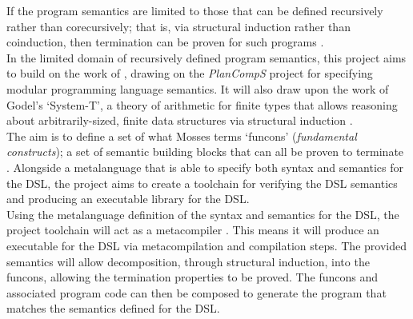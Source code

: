If the program semantics are limited to those that can be defined recursively rather than corecursively; that is, via structural induction rather than coinduction, then termination can be proven for such programs \citep{nordstrom1988terminating}.\\

In the limited domain of recursively defined program semantics, this project aims to build on the work of \cite{doh2001composing}, drawing on the \textit{PlanCompS} project for specifying modular programming language semantics.
It will also draw upon the work of Godel's `System-T', a theory of arithmetic for finite types that allows reasoning about arbitrarily-sized, finite data structures via structural induction \cite{girard1989proofs,alves2010godel}.\\

The aim is to define a set of what Mosses terms `funcons' (\textit{fundamental constructs}); a set of semantic building blocks that can all be proven to terminate \cite{Churchill:2014:RCS:2577080.2577099}.
Alongside a metalanguage that is able to specify both syntax and semantics for the DSL, the project aims to create a toolchain for verifying the DSL semantics and producing an executable library for the DSL.\\

Using the metalanguage definition of the syntax and semantics for the DSL, the project toolchain will act as a metacompiler \cite{Mandell:1966:MDA:800267.810785}.
This means it will produce an executable for the DSL via metacompilation and compilation steps.
The provided semantics will allow decomposition, through structural induction, into the funcons, allowing the termination properties to be proved.
The funcons and associated program code can then be composed to generate the program that matches the semantics defined for the DSL.\\


